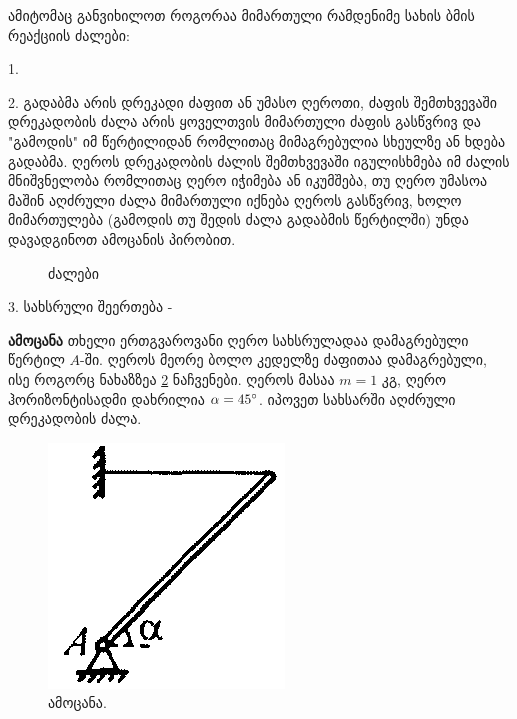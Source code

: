 \documentclass[a4paper]{book}
\begin{document}
ამიტომაც განვიხილოთ როგორაა მიმართული რამდენიმე სახის ბმის რეაქციის ძალები:
	
1. 
	
2. გადაბმა არის დრეკადი ძაფით ან უმასო ღეროთი, ძაფის შემთხვევაში დრეკადობის ძალა არის ყოველთვის მიმართული ძაფის გასწვრივ და "გამოდის" იმ წერტილიდან რომლითაც მიმაგრებულია სხეულზე ან ხდება გადაბმა. ღეროს დრეკადობის ძალის შემთხვევაში იგულისხმება იმ ძალის მნიშვნელობა რომლითაც ღერო იჭიმება ან იკუმშება, თუ ღერო უმასოა მაშინ აღძრული ძალა მიმართული იქნება ღეროს გასწვრივ, ხოლო მიმართულება (გამოდის თუ შედის ძალა გადაბმის წერტილში) უნდა დავადგინოთ ამოცანის პირობით.
		\begin{figure}[H]%
   			 \centering
    		\qquad
   	 		\caption{ძალები}%
    	\label{fig:example}%
		\end{figure}	 
	 
3. სახსრული შეერთება - 


\textbf{ამოცანა} თხელი ერთგვაროვანი ღერო სახსრულადაა დამაგრებული წერტილ $A$-ში. ღეროს მეორე ბოლო კედელზე ძაფითაა დამაგრებული, ისე როგორც ნახაზზეა \ref{fig:statics_1}  ნაჩვენები. ღეროს მასაა $m = 1$ კგ, ღერო ჰორიზონტისადმი დახრილია $\alpha = 45 \degree$. იპოვეთ სახსარში აღძრული დრეკადობის ძალა. 
	 	\begin{figure}[H]
	 	   \centering
           \includegraphics[width=0.2\columnwidth]{figures/statics_1}
           \caption{ამოცანა.}
           \label{fig:statics_1}
        \end{figure}
\end{document}
